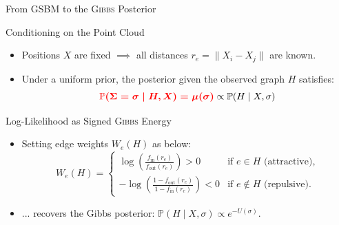\documentclass[A4,svgnames,9pt,aspectratio=169]{beamer}
\begin{document}
\begin{frame}{From GSBM to the \textsc{Gibbs} Posterior}
  \begin{block}{Conditioning on the Point Cloud}
    \begin{itemize}
      \item Positions $X$ are fixed $\implies$ all distances $r_e = \|X_i - X_j\|$ are known.
      \item Under a uniform prior, the posterior given the observed graph $H$ satisfies:
        \begin{equation*}
            \textcolor{red}{\boldsymbol{\mathbb{P}(\Sigma = \sigma \mid H, X) = \mu(\sigma)}} \mathrel{\propto} \mathbb{P}(H \mid X, \sigma)
        \end{equation*}
    \end{itemize}
  \end{block}
  \begin{block}{Log-Likelihood as Signed \textsc{Gibbs} Energy}
    \begin{itemize}
      \item Setting edge weights $W_e(H)$ as below:
        \begin{equation*}
            W_e(H)=
            \begin{cases}
                \displaystyle \log\left(\frac{f_{\mathrm{in}}(r_e)}{f_{\mathrm{out}}(r_e)}\right) > 0 & \text{if } e\in H \text{ (attractive),}\\[2ex]
                \displaystyle -\log\left(\frac{1-f_{\mathrm{out}}(r_e)}{1-f_{\mathrm{in}}(r_e)}\right) < 0 & \text{if } e\notin H \text{ (repulsive).}
            \end{cases}
        \end{equation*}
      \item ... recovers the Gibbs posterior: $\mathbb{P}(H \mid X, \sigma) \propto e^{-U(\sigma)}$.
    \end{itemize}
  \end{block}
\end{frame}
\end{document}
